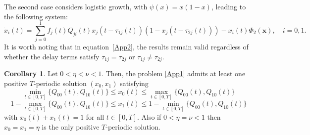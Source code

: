 \documentclass[11pt,reqno]{amsart}
\theoremstyle{definition}
\newtheorem{Corollary}{Corollary}
\begin{document}
The second case considers logistic growth, with $\psi(x) = x(1 - x)$, leading to the following system:
\begin{equation}\label{App2}
\dot x_i(t) = \sum_{j=0}^1 f_j(t) Q_{ji}(t) x_j(t - \tau_{1j}(t))(1 - x_j(t - \tau_{2j}(t))) - x_i(t) \Phi_{2}(\mathbf{x}), \quad i = 0, 1.
\end{equation}
It is worth noting that in equation~\eqref{App2}, the results remain valid regardless of whether the delay terms satisfy $\tau_{1j} = \tau_{2j}$ or $\tau_{1j} \neq \tau_{2j}$.
\begin{Corollary}\label{Teoapp1}  
Let $0<\eta<\nu<1$. Then, the problem \eqref{App1} admits at least one positive $T$-periodic solution $(x_0,x_1)$ satisfying
 \begin{equation*}
    \min_{t\in[0,T]}\{Q_{00}(t),Q_{10}(t)\}\leq x_0(t)\leq   \max_{t\in[0,T]}\{Q_{00}(t),Q_{10}(t)\} 
\end{equation*}
\begin{equation*}
   1- \max_{t\in[0,T]}\{Q_{00}(t),Q_{10}(t)\} \leq x_1(t)\leq 1- \min_{t\in[0,T]}\{Q_{00}(t),Q_{10}(t)\}  
\end{equation*}
with $x_0(t)+x_1(t)=1$ for all $t\in[0,T]$. Also if $0<\eta=\nu<1$ then $x_0=x_1=\eta$ is the only positive $T$-periodic solution.
\end{Corollary}
\end{document}
